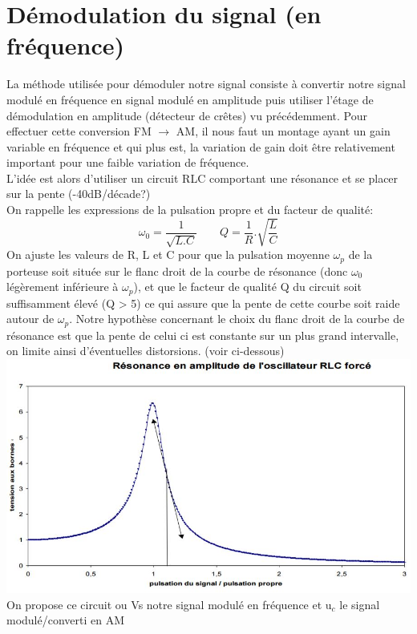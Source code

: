 \documentclass[12pt,a4paper]{article}
\begin{document}
\section{Démodulation du signal (en fréquence)}
La méthode utilisée pour démoduler notre signal consiste à convertir notre signal modulé en fréquence en signal modulé en amplitude puis utiliser l'étage de démodulation en amplitude (détecteur de crêtes) vu précédemment. Pour effectuer cette conversion FM $\rightarrow$ AM, il nous faut un montage ayant un gain variable en fréquence et qui plus est, la variation de gain doit être relativement important pour une faible variation de fréquence.\\
L'idée est alors d'utiliser un circuit RLC comportant une résonance et se placer sur la pente (-40dB/décade?)\\
On rappelle les expressions de la pulsation propre et du facteur de qualité:
$$\omega_0=\dfrac{1}{\sqrt{L.C}}\qquad Q=\dfrac{1}{R}.\sqrt{\dfrac{L}{C}}$$
On ajuste les valeurs de R, L et C pour que la pulsation moyenne $\omega_p$ de la porteuse  soit située sur le flanc droit de la courbe de résonance (donc $\omega_0$ légèrement inférieure à $\omega_p$), et que le facteur de qualité Q du circuit soit suffisamment élevé (Q > 5) ce qui assure que la pente de cette courbe soit raide autour de $\omega_p$.
Notre hypothèse concernant le choix du flanc droit de la courbe de résonance est que la pente de celui ci est constante sur un plus grand intervalle, on limite ainsi d'éventuelles distorsions. (voir ci-dessous)\\
\includegraphics[scale=0.6]{courbe}\\
On propose ce circuit ou Vs notre signal modulé en fréquence et u$_c$ le signal modulé/converti en AM\\
\end{document}
